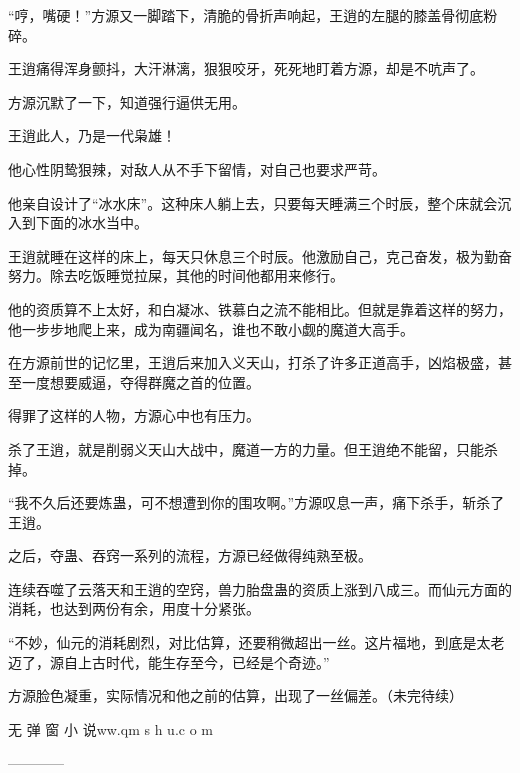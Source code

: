 \begin{this_body}
“哼，嘴硬！”方源又一脚踏下，清脆的骨折声响起，王逍的左腿的膝盖骨彻底粉碎。

王逍痛得浑身颤抖，大汗淋漓，狠狠咬牙，死死地盯着方源，却是不吭声了。

方源沉默了一下，知道强行逼供无用。

王逍此人，乃是一代枭雄！

他心性阴鸷狠辣，对敌人从不手下留情，对自己也要求严苛。

他亲自设计了“冰水床”。这种床人躺上去，只要每天睡满三个时辰，整个床就会沉入到下面的冰水当中。

王逍就睡在这样的床上，每天只休息三个时辰。他激励自己，克己奋发，极为勤奋努力。除去吃饭睡觉拉屎，其他的时间他都用来修行。

他的资质算不上太好，和白凝冰、铁慕白之流不能相比。但就是靠着这样的努力，他一步步地爬上来，成为南疆闻名，谁也不敢小觑的魔道大高手。

在方源前世的记忆里，王逍后来加入义天山，打杀了许多正道高手，凶焰极盛，甚至一度想要威逼，夺得群魔之首的位置。

得罪了这样的人物，方源心中也有压力。

杀了王逍，就是削弱义天山大战中，魔道一方的力量。但王逍绝不能留，只能杀掉。

“我不久后还要炼蛊，可不想遭到你的围攻啊。”方源叹息一声，痛下杀手，斩杀了王逍。

之后，夺蛊、吞窍一系列的流程，方源已经做得纯熟至极。

连续吞噬了云落天和王逍的空窍，兽力胎盘蛊的资质上涨到八成三。而仙元方面的消耗，也达到两份有余，用度十分紧张。

“不妙，仙元的消耗剧烈，对比估算，还要稍微超出一丝。这片福地，到底是太老迈了，源自上古时代，能生存至今，已经是个奇迹。”

方源脸色凝重，实际情况和他之前的估算，出现了一丝偏差。（未完待续）

无 弹 窗 小 说ww.qm s h u.c o m

------------

\end{this_body}

